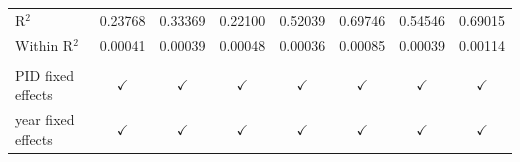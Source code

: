 \begin{tabular}{lccccccc}
   R$^2$              & 0.23768         & 0.33369                       & 0.22100          & 0.52039                           & 0.69746                           & 0.54546                                         & 0.69015\\  
   Within R$^2$       & 0.00041         & 0.00039                       & 0.00048          & 0.00036                           & 0.00085                           & 0.00039                                         & 0.00114\\  
    \\
   PID fixed effects  & $\checkmark$    & $\checkmark$                  & $\checkmark$     & $\checkmark$                      & $\checkmark$                      & $\checkmark$                                    & $\checkmark$\\   
   year fixed effects & $\checkmark$    & $\checkmark$                  & $\checkmark$     & $\checkmark$                      & $\checkmark$                      & $\checkmark$                                    & $\checkmark$\\   
   \bottomrule
\end{tabular}
\par\endgroup



